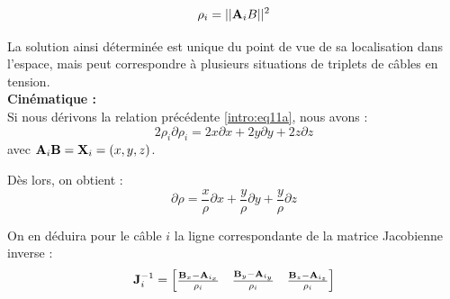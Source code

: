 \begin{equation}
\rho_i = ||{\bf A}_iB||^2
\label{intro:eq11a}
\end{equation}

La solution ainsi d\'etermin\'ee est unique du point de vue de sa localisation 
dans l'espace, mais peut correspondre \`a plusieurs situations de triplets de 
c\^ables en tension.\\

{\bf Cin\'ematique :}\\

Si nous d\'erivons la relation pr\'ec\'edente \ref{intro:eq11a}, nous avons :
\begin{equation}
2 \rho_i \partial \rho_i = 2 x \partial x + 2 y \partial y + 2 z \partial z
\label{intro:eq11a2}
\end{equation}
avec ${\bf A}_i{\bf B} = {\bf X}_i = (x, y, z)$.

D\`es lors, on obtient :
\begin{equation}
\partial \rho = \frac x \rho \partial x + \frac y \rho \partial y + \frac y 
\rho \partial z
\label{intro:eq11a3}
\end{equation}

On en d\'eduira pour le c\^able $i$ la ligne correspondante de la 
matrice Jaco\-bienne inverse :
\begin{equation}
{\bf J}^{-1}_i = 
\begin{bmatrix}
\frac {{\bf B}_x - {\bf A}_{i_x}} {\rho_i} & \frac {{\bf B}_y - {\bf A}_{i_y}} 
{\rho_i} & \frac {{\bf B}_z - {\bf A}_{i_z}} {\rho_i} 
\end{bmatrix}
\label{intro:eq11a4}
\end{equation}




\vfill